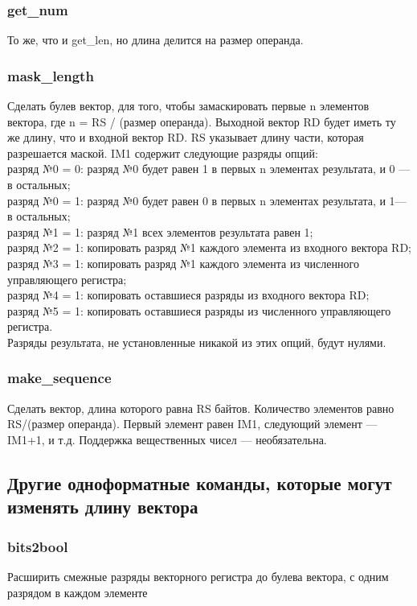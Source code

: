 \documentclass[forwardcom.tex]{subfiles}
\begin{document}
\subsubsection{get\_num}
То же, что и  get\_len, но длина делится на размер операнда.

\subsubsection{mask\_length}
Сделать булев вектор, для того, чтобы замаскировать первые n элементов вектора, где n = RS / (размер операнда). Выходной вектор RD будет иметь ту же длину, что и входной вектор RD. RS указывает длину части, которая разрешается маской. IM1 содержит следующие разряды опций:\\
разряд №0 = 0: разряд №0 будет равен 1 в первых n элементах результата, и 0 --- в остальных; \\
разряд №0 = 1: разряд №0 будет равен 0 в первых n элементах результата, и 1--- в остальных; \\
разряд №1 = 1: разряд №1 всех элементов результата равен 1; \\
разряд №2 = 1: копировать разряд №1 каждого элемента из входного вектора RD; \\
разряд №3 = 1: копировать разряд №1 каждого элемента из численного управляющего регистра; \\
разряд №4 = 1: копировать оставшиеся разряды из входного вектора RD; \\
разряд №5 = 1: копировать оставшиеся разряды из численного управляющего регистра. \\
Разряды результата, не установленные никакой из этих опций, будут нулями.

\subsubsection{make\_sequence}
Сделать вектор, длина которого равна RS байтов. Количество элементов равно RS/(размер операнда). Первый элемент равен IM1, следующий элемент --- IM1+1, и т.д. Поддержка вещественных чисел --- необязательна.


\subsection{Другие одноформатные команды, которые могут изменять длину вектора}
\subsubsection{bits2bool}
Расширить смежные разряды векторного регистра до булева вектора, с одним разрядом в каждом элементе
\end{document}

